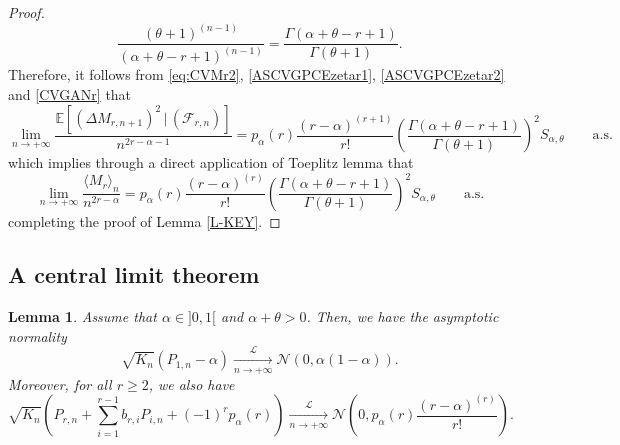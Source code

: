 \documentclass[twoside,12pt]{article}
\newcommand{\cL}{\mathcal{L}}
\newcommand{\E}{\mathds{E}}
\newcommand{\cN}{\mathcal{N}}
\newtheorem{lem}[thm]{Lemma}
\begin{document}
\begin{proof}
\begin{equation}
\frac{(\theta+1)^{(n-1)}}{(\alpha+\theta-r+1)^{(n-1)}}=\frac{\Gamma(\alpha+\theta-r+1)}{\Gamma(\theta+1)}.
\end{equation}
Therefore, it follows from \eqref{eq:CVMr2}, \eqref{ASCVGPCEzetar1}, \eqref{ASCVGPCEzetar2} and \eqref{CVGANr} that
\begin{equation*}
\lim_{n\rightarrow+\infty} \frac{\E[(\Delta M_{r,n+1})^{2}\,|\,(\mathcal{F}_{r,n})]}{n^{2r-\alpha -1}}=
p_{\alpha}(r) \frac{(r-\alpha)^{(r+1)}}{r!} \left(\frac{\Gamma(\alpha+\theta-r+1)}{\Gamma(\theta+1)}\right)^2 S_{\alpha, \theta}  \qquad \text{a.s.}
\end{equation*}
which implies through a direct application of Toeplitz lemma that
\begin{equation*}
\lim_{n\rightarrow+\infty}\frac{\langle M_{r}\rangle_{n}}{n^{2r-\alpha}}=p_{\alpha}(r)\frac{(r-\alpha)^{(r)}}{r!}\left(\frac{\Gamma(\alpha+\theta-r+1)}{\Gamma(\theta+1)}\right)^{2}S_{\alpha,\theta}\qquad\text{a.s.}
\end{equation*}
completing the proof of Lemma \ref{L-KEY}.
\end{proof}


\subsection{A central limit theorem} 
\label{Sub-SCLT}


\begin{lem}
\label{L-ScalarCLT}
Assume that $\alpha\in]0,1[$ and  $\alpha+\theta>0$. Then, we have the asymptotic normality
\begin{equation}
\label{LCLT1}
\sqrt{K_n}( P_{1,n} -\alpha )
\underset{n\rightarrow+\infty}{\overset{\cL}{\longrightarrow}}
\cN(0, \alpha(1-\alpha)).
\end{equation} 
Moreover, for all $r\geq 2$, we also have
\begin{equation}
\label{LCLTr}
\sqrt{K_{n}} \left(P_{r,n}   + \sum_{i=1}^{r-1}b_{r,i}P_{i,n} +(-1)^r p_{\alpha}(r) \right)\underset{n\rightarrow+\infty}{\overset{\cL}{\longrightarrow}} \cN\left(0, p_{\alpha}(r)\frac{(r-\alpha)^{(r)}}{r!}\right).
\end{equation}
\end{lem}
\end{document}
